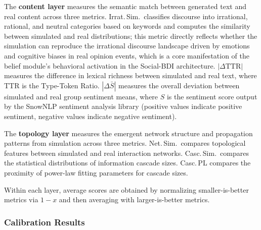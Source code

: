 \documentclass[a4paper,fleqn]{cas-dc}
\begin{document}
The \textbf{content layer} measures the semantic match between generated text and real content across three metrics. Irrat.\,Sim.\ classifies discourse into irrational, rational, and neutral categories based on keywords and computes the similarity between simulated and real distributions; this metric directly reflects whether the simulation can reproduce the irrational discourse landscape driven by emotions and cognitive biases in real opinion events, which is a core manifestation of the belief module's behavioral activation in the Social-BDI architecture. $|\Delta\text{TTR}|$ measures the difference in lexical richness between simulated and real text, where TTR is the Type-Token Ratio. $|\Delta\bar{S}|$ measures the overall deviation between simulated and real group sentiment means, where $S$ is the sentiment score output by the SnowNLP sentiment analysis library (positive values indicate positive sentiment, negative values indicate negative sentiment).

The \textbf{topology layer} measures the emergent network structure and propagation patterns from simulation across three metrics. Net.\,Sim.\ compares topological features between simulated and real interaction networks. Casc.\,Sim.\ compares the statistical distributions of information cascade sizes. Casc.\,PL compares the proximity of power-law fitting parameters for cascade sizes.

Within each layer, average scores are obtained by normalizing smaller-is-better metrics via $1{-}x$ and then averaging with larger-is-better metrics.

\subsubsection{Calibration Results}
\end{document}
